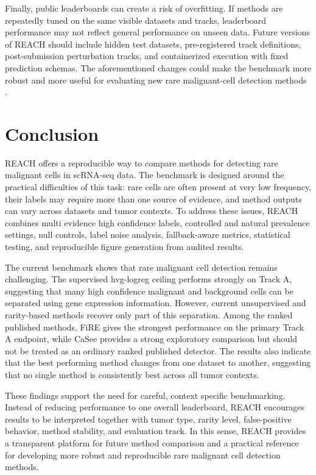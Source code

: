 \documentclass[10pt]{article}
\begin{document}
Finally, public leaderboards can create a risk of overfitting. If methods are repeatedly tuned on the same visible datasets and tracks, leaderboard performance may not reflect general performance on unseen data. Future versions of REACH should include hidden test datasets, pre-registered track definitions, post-submission perturbation tracks, and containerized execution with fixed prediction schemas. The aforementioned changes could make the benchmark more robust and more useful for evaluating new rare malignant-cell detection methods \cite{song2023benchmarking,li2023comprehensive}.

\section{Conclusion}

REACH offers a reproducible way to compare methods for detecting rare malignant cells in scRNA-seq data. The benchmark is designed around the practical difficulties of this task: rare cells are often present at very low frequency, their labels may require more than one source of evidence, and method outputs can vary across datasets and tumor contexts. To address these issues, REACH combines multi evidence high confidence labels, controlled and natural prevalence settings, null controls, label noise analysis, fallback-aware metrics, statistical testing, and reproducible figure generation from audited results.

The current benchmark shows that rare malignant cell detection remains challenging. The supervised hvg-logreg ceiling performs strongly on Track A, suggesting that many high confidence malignant and background cells can be separated using gene expression information. However, current unsupervised and rarity-based methods recover only part of this separation. Among the ranked published methods, FiRE gives the strongest performance on the primary Track A endpoint, while CaSee provides a strong exploratory comparison but should not be treated as an ordinary ranked published detector. The results also indicate that the best performing method changes from one dataset to another, suggesting that no single method is consistently best across all tumor contexts.

These findings support the need for careful, context specific benchmarking. Instead of reducing performance to one overall leaderboard, REACH encourages results to be interpreted together with tumor type, rarity level, false-positive behavior, method stability, and evaluation track. In this sense, REACH provides a transparent platform for future method comparison and a practical reference for developing more robust and reproducible rare malignant cell detection methods.
\end{document}
